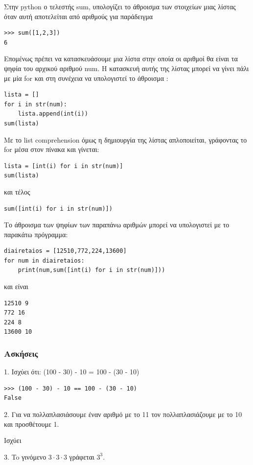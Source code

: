 Στην python ο τελεστής sum, υπολογίζει το άθροισμα των στοιχείων μιας λίστας όταν αυτή αποτελείται από αριθμούς για παράδειγμα
\begin{lstlisting}
>>> sum([1,2,3])
6
\end{lstlisting}
Επομένως πρέπει να κατασκευάσουμε μια λίστα στην οποία οι αριθμοί θα είναι τα ψηφία του αρχικού αριθμού num. Η κατασκευή αυτής της λίστας μπορεί να γίνει πάλι με μία for και στη συνέχεια να υπολογιστεί το άθροισμα :
\begin{lstlisting}
lista = []
for i in str(num):
    lista.append(int(i))
sum(lista)
\end{lstlisting}
Με το list comprehension όμως η δημιουργία της λίστας απλοποιείται, γράφοντας το for μέσα στον πίνακα και γίνεται:
\begin{lstlisting}
lista = [int(i) for i in str(num)]
sum(lista)
\end{lstlisting}
και τέλος
\begin{lstlisting}
sum([int(i) for i in str(num)])
\end{lstlisting}
Το άθροισμα των ψηφίων των παραπάνω αριθμών μπορεί να υπολογιστεί με το παρακάτω πρόγραμμα:
\begin{lstlisting}
diairetaios = [12510,772,224,13600]
for num in diairetaios:
    print(num,sum([int(i) for i in str(num)]))
\end{lstlisting}
και είναι
\begin{lstlisting}
12510 9
772 16
224 8
13600 10
\end{lstlisting}
\subsubsection{Ασκήσεις}
\begin{exercise}
 1. Ισχύει ότι: (100 - 30) - 10 = 100 - (30 - 10)\end{exercise}

\begin{lstlisting}
>>> (100 - 30) - 10 == 100 - (30 - 10)
False
\end{lstlisting}
         
\begin{exercise}
 2. Για να πολλαπλασιάσουμε έναν αριθμό με το 11 τον πολλαπλασιάζουμε με το 10 και προσθέτουμε 1.\end{exercise}

Ισχύει   
\begin{exercise}
 3. To γινόμενο $3\cdot 3 \cdot 3$ γράφεται $3^3$.\end{exercise}


